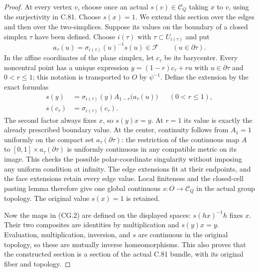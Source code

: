 \begin{proof}
At every vertex $v$, choose once an actual
$s(v)\in\mathscr C_Q$ taking $x$ to $v$,
using the surjectivity in C.81.  Choose $s(x)=1$.
We extend this section over the edges and then over
the two-simplices.  Suppose its values on the boundary
of a closed simplex $\tau$ have been defined.
Choose $i(\tau)$ with $\tau\subset U_{i(\tau)}$ and put
\[
 a_\tau(u)=\sigma_{i(\tau)}(u)^{-1}s(u)\in\mathscr F
                         \qquad(u\in\partial\tau).            \tag{CG.12}
\]
In the affine coordinates of the plane simplex, let
$c_\tau$ be its barycenter.  Every noncentral point
has a unique expression $y=(1-r)c_\tau+ru$ with
$u\in\partial\tau$ and $0<r\leq1$; this notation
is transported to $O$ by $\psi^{-1}$.
Define the extension by the exact formulas
\[
 \begin{aligned}
 s(y)&=\sigma_{i(\tau)}(y)
                   A_{1-r}\bigl(a_\tau(u)\bigr)
           &&(0<r\leq1),\\
 s(c_\tau)&=\sigma_{i(\tau)}(c_\tau).
 \end{aligned}                                                    \tag{CG.13}
\]
The second factor always fixes $x$, so $s(y)x=y$.
At $r=1$ its value is exactly the already prescribed
boundary value.  At the center, continuity follows
from $A_1=1$ uniformly on the compact set
$a_\tau(\partial\tau)$: the restriction of the
continuous map $A$ to
$[0,1]\times a_\tau(\partial\tau)$ is uniformly
continuous in any compatible metric on its image.
This checks the possible polar-coordinate singularity
without imposing any uniform condition at infinity.
The edge extensions fit at their endpoints, and
the face extensions retain every edge value.
Local finiteness and the closed-cell pasting lemma
therefore give one global continuous
$s:O\to\mathscr C_Q$ in the actual group topology.
The original value $s(x)=1$ is retained.

Now the maps in (CG.2) are defined on the displayed
spaces: $s(hx)^{-1}h$ fixes $x$.
Their two composites are identities by multiplication
and $s(y)x=y$.  Evaluation, multiplication, inversion,
and $s$ are continuous in the original topology,
so these are mutually inverse homeomorphisms.
This also proves that the constructed section is a
section of the actual C.81 bundle, with its original
fiber and topology.


\end{proof}
